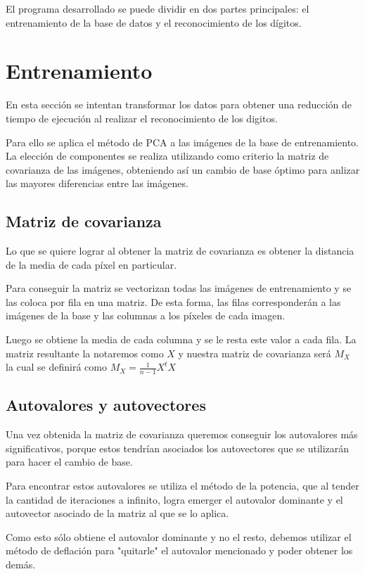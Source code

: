 El programa desarrollado se puede dividir en dos partes principales: el entrenamiento de la base de datos y el reconocimiento de los dígitos.

\section{Entrenamiento}
En esta sección se intentan transformar los datos para obtener una reducción de tiempo de ejecución al realizar el reconocimiento de los digitos. 

Para ello se aplica el método de PCA a las imágenes de la base de entrenamiento. La elección de componentes se realiza utilizando como criterio la matriz de covarianza de las imágenes, obteniendo así un cambio de base óptimo para anlizar las mayores diferencias entre las imágenes.

\subsection{Matriz de covarianza}

Lo que se quiere lograr al obtener la matriz de covarianza es obtener la distancia de la media de cada píxel en particular.

Para conseguir la matriz se vectorizan todas las imágenes de entrenamiento y se las coloca por fila en una matriz. De esta forma, las filas corresponderán a las imágenes de la base y las columnas a los píxeles de cada imagen.

Luego se obtiene la media de cada columna y se le resta este valor a cada fila. La matriz resultante la notaremos como $X$ y nuestra matriz de covarianza será $M_{X}$ la cual se definirá como $M_{X} = \frac{1}{n-1} X^{t} X$

\subsection{Autovalores y autovectores}

Una vez obtenida la matriz de covarianza queremos conseguir los autovalores más significativos, porque estos tendrían asociados los autovectores que se utilizarán para hacer el cambio de base. 

Para encontrar estos autovalores se utiliza el método de la potencia, que al tender la cantidad de iteraciones a infinito, logra emerger el autovalor dominante y el autovector asociado de la matriz al que se lo aplica.

Como esto sólo obtiene el autovalor dominante y no el resto, debemos utilizar el método de deflación para "quitarle" el autovalor mencionado y poder obtener los demás.

